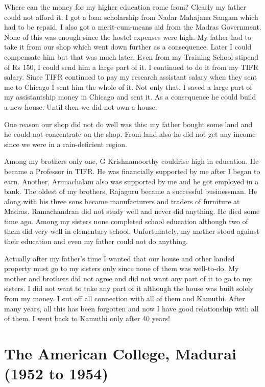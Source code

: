 Where can the money for my higher education come from? Clearly my father 
could not afford it. I got a loan scholarship from Nadar Mahajana Sangam 
which had to be repaid. I also got a merit-cum-means aid from the Madras 
Government. None of this was enough since the hostel expenses were high. 
My father had to take it from our shop which went down further as a 
consequence. Later I could compensate him but that was much later. Even 
from my Training School stipend of Rs 150, I could send him a large part 
of it. I continued to do it from my TIFR salary. Since TIFR continued to 
pay my research assistant salary when they sent me to Chicago I sent him 
the whole of it. Not only that. I saved a large part of my assistantship 
money in Chicago and sent it. As a consequence he could build a new 
house. Until then we did not own a house.


One reason our shop did not do well was this: my father bought some land 
and he could not concentrate on the shop. From land also he did not get 
any income since we were in a rain-deficient region.


Among my brothers only one, G Krishnamoorthy could\break rise high in 
education. He became a Professor in TIFR. He was financially supported 
by me after I began to earn. Another, Arunachalam also was supported by 
me and he got employed in a bank. The oldest of my brothers, Rajaguru 
became a successful businessman. He along with his three sons became 
manufacturers and traders of furniture at Madras. Ramachandran did not 
study well and never did anything. He died some time ago. Among my 
sisters none completed school education although two of them did very 
well in elementary school. Unfortunately, my mother stood against their 
education and even my father could not do anything.


Actually after my father's time I wanted that our house and other landed 
property must go to my sisters only since none of them was well-to-do.  
My mother and brothers did not agree and did not want any part of it to 
go to my sisters. I did not want to take any part of it although the 
house was built solely from my money. I cut off all connection with all 
of them and Kamuthi. After many years, all this has been forgotten and 
now I have good relationship with all of them. I went back to Kamuthi 
only after 40 years!

\vspace{-\topsep}
\section*{The American College, Madurai (1952 to 1954)}

